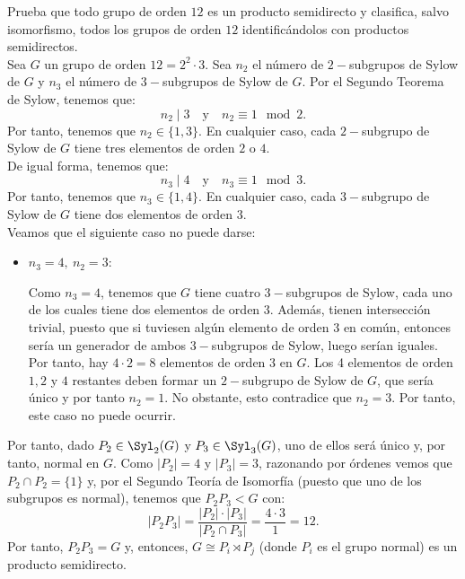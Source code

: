 \newpage
\begin{ejercicio}
    Prueba que todo grupo de orden \(12\) es un producto semidirecto y clasifica, salvo isomorfismo, todos los grupos de orden \(12\) identificándolos con productos semidirectos.\\

    Sea \(G\) un grupo de orden \(12=2^2\cdot 3\). Sea $n_2$ el número de \(2-\)subgrupos de Sylow de \(G\) y $n_3$ el número de \(3-\)subgrupos de Sylow de \(G\). Por el Segundo Teorema de Sylow, tenemos que:
    \begin{equation*}
        n_2\mid 3 \quad \text{y} \quad n_2 \equiv 1 \mod 2.
    \end{equation*}
    Por tanto, tenemos que \(n_2\in \{1, 3\}\). En cualquier caso, cada \(2-\)subgrupo de Sylow de \(G\) tiene tres elementos de orden \(2\) o \(4\).\\

    De igual forma, tenemos que:
    \begin{equation*}
        n_3\mid 4 \quad \text{y} \quad n_3 \equiv 1 \mod 3.
    \end{equation*}
    Por tanto, tenemos que \(n_3\in \{1, 4\}\). En cualquier caso, cada \(3-\)subgrupo de Sylow de \(G\) tiene dos elementos de orden \(3\).\\

    Veamos que el siguiente caso no puede darse:
    \begin{itemize}
        \item \ul{$n_3=4,\ n_2=3$}:
        
        Como $n_3=4$, tenemos que \(G\) tiene cuatro \(3-\)subgrupos de Sylow, cada uno de los cuales tiene dos elementos de orden \(3\). Además, tienen intersección trivial, puesto que si tuviesen algún elemento de orden \(3\) en común, entonces sería un generador de ambos \(3-\)subgrupos de Sylow, luego serían iguales. Por tanto, hay \(4\cdot 2=8\) elementos de orden \(3\) en \(G\). Los 4 elementos de orden \(1,2\) y \(4\) restantes deben formar un \(2-\)subgrupo de Sylow de \(G\), que sería único y por tanto \(n_2=1\). No obstante, esto contradice que \(n_2=3\). Por tanto, este caso no puede ocurrir.
    \end{itemize}

    Por tanto, dado $P_2\in \Syl_2(G)$ y $P_3\in \Syl_3(G)$, uno de ellos será único y, por tanto, normal en \(G\). Como $|P_2|=4$ y $|P_3|=3$, razonando por órdenes vemos que $P_2\cap P_2=\{1\}$ y, por el Segundo Teoría de Isomorfía (puesto que uno de los subgrupos es normal), tenemos que $P_2P_3<G$ con:
    \begin{equation*}
        |P_2P_3| = \frac{|P_2|\cdot |P_3|}{|P_2\cap P_3|} = \frac{4\cdot 3}{1} = 12.
    \end{equation*}
    Por tanto, \(P_2P_3=G\) y, entonces, $G\cong P_i\rtimes P_j$ (donde $P_i$ es el grupo normal) es un producto semidirecto.\\


\end{ejercicio}
